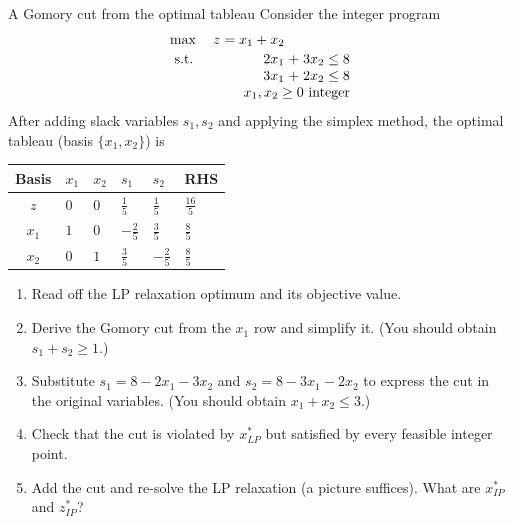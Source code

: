 \begin{ex}{A Gomory cut from the optimal tableau}{}
\label{ex:ch13-gomory-tableau}
Consider the integer program
\[
\begin{array}{l r@{\;}c@{\;}r@{\;}c@{\;}r}
\max & z = x_1 + x_2 & & & & \\[2pt]
\st  & 2x_1 & + & 3x_2 & \leq & 8 \\
     & 3x_1 & + & 2x_2 & \leq & 8 \\
     & \multicolumn{5}{r}{x_1, x_2 \geq 0 \text{ integer}}
\end{array}
\]
After adding slack variables $s_1, s_2$ and applying the simplex method, the
optimal tableau (basis $\{x_1, x_2\}$) is
\begin{center}
\renewcommand{\arraystretch}{1.3}
\begin{tabular}{c|ZZZZ|Z}
\toprule
Basis & $x_1$ & $x_2$ & $s_1$ & $s_2$ & RHS\\
\midrule
$z$   & $0$ & $0$ & $\tfrac15$ & $\tfrac15$ & $\tfrac{16}{5}$\\
\midrule
$x_1$ & $1$ & $0$ & $-\tfrac25$ & $\tfrac35$ & $\tfrac85$\\
$x_2$ & $0$ & $1$ & $\tfrac35$  & $-\tfrac25$ & $\tfrac85$\\
\bottomrule
\end{tabular}
\end{center}
\begin{enumerate}
\item Read off the LP relaxation optimum and its objective value.
\item Derive the Gomory cut from the $x_1$ row and simplify it.  (You should
obtain $s_1 + s_2 \geq 1$.)
\item Substitute $s_1 = 8 - 2x_1 - 3x_2$ and $s_2 = 8 - 3x_1 - 2x_2$ to
express the cut in the original variables.  (You should obtain
$x_1 + x_2 \leq 3$.)
\item Check that the cut is violated by $x^*_{LP}$ but satisfied by every
feasible integer point.
\item Add the cut and re-solve the LP relaxation (a picture suffices).  What
are $x^*_{IP}$ and $z^*_{IP}$?
\end{enumerate}
\exrefs{\S\ref{subsec:gomory-cuts}; \S\ref{subsec:cutting-plane-procedure}}
\end{ex}

